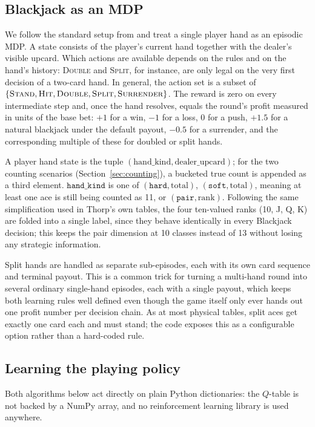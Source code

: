 \documentclass[conference,a4paper]{IEEEtran}
\begin{document}
\subsection{Blackjack as an MDP}
We follow the standard setup from \cite{suttonbarto} and treat a single player hand as an episodic MDP. A state consists of the player's current hand together with the dealer's visible upcard. Which actions are available depends on the rules and on the hand's history: \textsc{Double} and \textsc{Split}, for instance, are only legal on the very first decision of a two-card hand. In general, the action set is a subset of $\{\textsc{Stand}, \textsc{Hit}, \textsc{Double}, \textsc{Split}, \textsc{Surrender}\}$. The reward is zero on every intermediate step and, once the hand resolves, equals the round's profit measured in units of the base bet: $+1$ for a win, $-1$ for a loss, $0$ for a push, $+1.5$ for a natural blackjack under the default payout, $-0.5$ for a surrender, and the corresponding multiple of these for doubled or split hands.

A player hand state is the tuple $(\text{hand\_kind}, \text{dealer\_upcard})$; for the two counting scenarios (Section~\ref{sec:counting}), a bucketed true count is appended as a third element. $\texttt{hand\_kind}$ is one of $(\texttt{hard}, \text{total})$, $(\texttt{soft}, \text{total})$, meaning at least one ace is still being counted as 11, or $(\texttt{pair}, \text{rank})$. Following the same simplification used in Thorp's own tables, the four ten-valued ranks (10, J, Q, K) are folded into a single label, since they behave identically in every Blackjack decision; this keeps the pair dimension at 10 classes instead of 13 without losing any strategic information.

Split hands are handled as separate sub-episodes, each with its own card sequence and terminal payout. This is a common trick for turning a multi-hand round into several ordinary single-hand episodes, each with a single payout, which keeps both learning rules well defined even though the game itself only ever hands out one profit number per decision chain. As at most physical tables, split aces get exactly one card each and must stand; the code exposes this as a configurable option rather than a hard-coded rule.

\subsection{Learning the playing policy}
Both algorithms below act directly on plain Python dictionaries: the $Q$-table is not backed by a NumPy array, and no reinforcement learning library is used anywhere.
\end{document}
